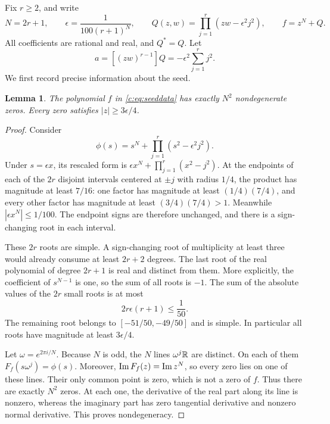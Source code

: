 \documentclass[UTF8,11pt]{ctexart}
\newtheorem{lem}[thm]{Lemma}
\theoremstyle{definition}
\numberwithin{equation}{section}
\begin{document}
Fix $r\ge2$, and write
\begin{equation}\label{c:eq:seeddata}
 N=2r+1,\qquad
 \epsilon=\frac1{100(r+1)^N},\qquad
 Q(z,w)=\prod_{j=1}^r(zw-\epsilon^2j^2),\qquad
 f=z^N+Q.
\end{equation}
All coefficients are rational and real, and $Q^*=Q$. Let
\begin{equation}\label{c:eq:coefficient}
 a=[(zw)^{r-1}]Q=-\epsilon^2\sum_{j=1}^rj^2.
\end{equation}
We first record precise information about the seed.
\begin{lem}\label{c:lem:seed}
The polynomial $f$ in \eqref{c:eq:seeddata} has exactly $N^2$
nondegenerate zeros. Every zero satisfies $|z|\ge3\epsilon/4$.
\end{lem}
\begin{proof}
Consider
\[
 \phi(s)=s^N+\prod_{j=1}^r(s^2-\epsilon^2j^2).
\]
Under $s=\epsilon x$, its rescaled form is
$\epsilon x^N+\prod_{j=1}^r(x^2-j^2)$. At the endpoints of each of the
$2r$ disjoint intervals centered at $\pm j$ with radius $1/4$, the
product has magnitude at least $7/16$: one factor has magnitude at
least $(1/4)(7/4)$, and every other factor has magnitude at least
$(3/4)(7/4)>1$. Meanwhile
$|\epsilon x^N|\le1/100$. The endpoint signs are therefore unchanged,
and there is a sign-changing root in each interval.

These $2r$ roots are simple. A sign-changing root of multiplicity at
least three would already consume at least $2r+2$ degrees. The last
root of the real polynomial of degree $2r+1$ is real and distinct from
them. More explicitly, the coefficient of $s^{N-1}$ is one, so the
sum of all roots is $-1$. The sum of the absolute values of the $2r$
small roots is at most
\[
 2r\epsilon(r+1)\le\frac1{50}.
\]
The remaining root belongs to $[-51/50,-49/50]$ and is simple. In
particular all roots have magnitude at least $3\epsilon/4$.

Let $\omega=e^{2\pi i/N}$. Because $N$ is odd, the $N$ lines
$\omega^j\mathbb R$ are distinct. On each of them $F_f(s\omega^j)=\phi(s)$.
Moreover, $\operatorname{Im} F_f(z)=\operatorname{Im} z^N$, so every zero lies on one of these
lines. Their only common point is zero, which is not a zero of $f$.
Thus there are exactly $N^2$ zeros. At each one, the derivative of the
real part along its line is nonzero, whereas the imaginary part has
zero tangential derivative and nonzero normal derivative. This proves
nondegeneracy.
\end{proof}
\end{document}
